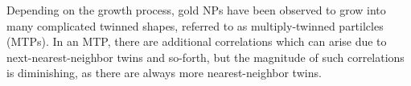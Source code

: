 \documentclass [11pt,fleqn]{article}
\def \be {\begin{equation}}
\def \ee {\end{equation}}
\begin{document}
Depending on the growth process, gold NPs have been observed to grow into many complicated twinned shapes, referred to as multiply-twinned partilcles (MTPs). In an MTP, there are additional correlations which can arise due to next-nearest-neighbor twins and so-forth, but the magnitude of such correlations is diminishing, as there are always more nearest-neighbor twins. 







\end{document}
